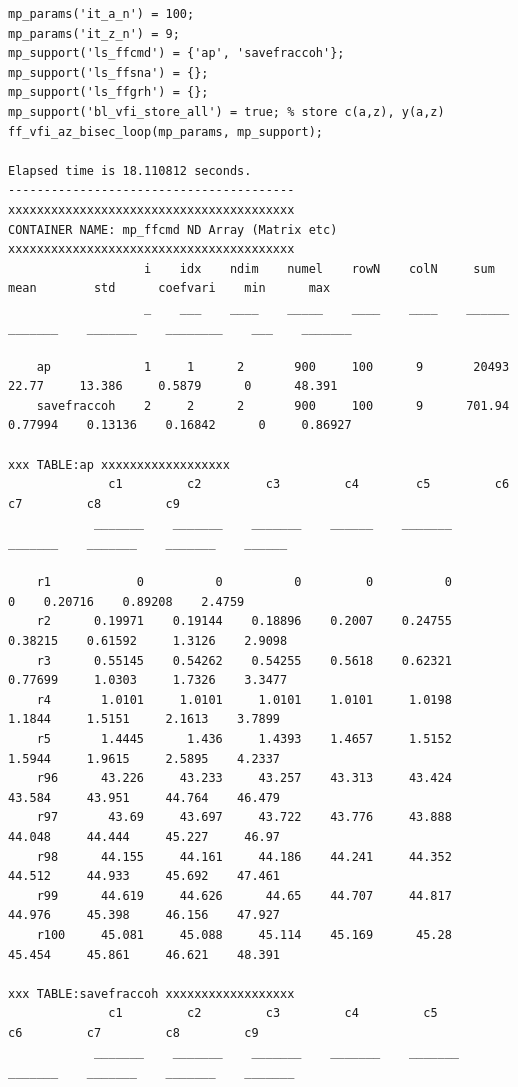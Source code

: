 \documentclass[
]{book}
\begin{document}
\begin{verbatim}
mp_params('it_a_n') = 100;
mp_params('it_z_n') = 9;
mp_support('ls_ffcmd') = {'ap', 'savefraccoh'};
mp_support('ls_ffsna') = {};
mp_support('ls_ffgrh') = {};
mp_support('bl_vfi_store_all') = true; % store c(a,z), y(a,z)
ff_vfi_az_bisec_loop(mp_params, mp_support);

Elapsed time is 18.110812 seconds.
----------------------------------------
xxxxxxxxxxxxxxxxxxxxxxxxxxxxxxxxxxxxxxxx
CONTAINER NAME: mp_ffcmd ND Array (Matrix etc)
xxxxxxxxxxxxxxxxxxxxxxxxxxxxxxxxxxxxxxxx
                   i    idx    ndim    numel    rowN    colN     sum       mean        std      coefvari    min      max  
                   _    ___    ____    _____    ____    ____    ______    _______    _______    ________    ___    _______

    ap             1     1      2       900     100      9       20493      22.77     13.386     0.5879      0      48.391
    savefraccoh    2     2      2       900     100      9      701.94    0.77994    0.13136    0.16842      0     0.86927

xxx TABLE:ap xxxxxxxxxxxxxxxxxx
              c1         c2         c3         c4        c5         c6         c7         c8         c9  
            _______    _______    _______    ______    _______    _______    _______    _______    ______

    r1            0          0          0         0          0          0    0.20716    0.89208    2.4759
    r2      0.19971    0.19144    0.18896    0.2007    0.24755    0.38215    0.61592     1.3126    2.9098
    r3      0.55145    0.54262    0.54255    0.5618    0.62321    0.77699     1.0303     1.7326    3.3477
    r4       1.0101     1.0101     1.0101    1.0101     1.0198     1.1844     1.5151     2.1613    3.7899
    r5       1.4445      1.436     1.4393    1.4657     1.5152     1.5944     1.9615     2.5895    4.2337
    r96      43.226     43.233     43.257    43.313     43.424     43.584     43.951     44.764    46.479
    r97       43.69     43.697     43.722    43.776     43.888     44.048     44.444     45.227     46.97
    r98      44.155     44.161     44.186    44.241     44.352     44.512     44.933     45.692    47.461
    r99      44.619     44.626      44.65    44.707     44.817     44.976     45.398     46.156    47.927
    r100     45.081     45.088     45.114    45.169      45.28     45.454     45.861     46.621    48.391

xxx TABLE:savefraccoh xxxxxxxxxxxxxxxxxx
              c1         c2         c3         c4         c5         c6         c7         c8         c9   
            _______    _______    _______    _______    _______    _______    _______    _______    _______


\end{verbatim}
\end{document}
